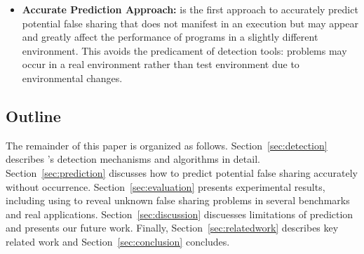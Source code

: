 \begin{itemize}
\item
\textbf{Accurate Prediction Approach:} is the first approach to accurately predict potential false sharing that does
not manifest in an execution but may appear and greatly affect the performance of programs 
in a slightly different environment. 
This avoids the predicament of detection tools: problems may occur in a real
environment rather than test environment due to environmental changes. 


\end{itemize}

\subsection*{Outline}

The remainder of this paper is organized as follows. 
Section~\ref{sec:detection} describes 's detection mechanisms and
algorithms in detail.
Section~\ref{sec:prediction} discusses how to predict potential false sharing accurately 
without occurrence. 
Section~\ref{sec:evaluation} presents experimental results, including using  to 
reveal unknown false sharing problems in several benchmarks and real applications. 
Section~\ref{sec:discussion} discuesses limitations of prediction and presents our future work.
Finally, 
Section~\ref{sec:relatedwork} describes key related work and Section~\ref{sec:conclusion} concludes.


